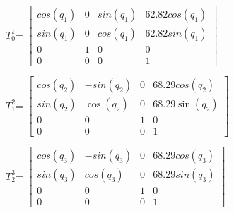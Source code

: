 \begin{center}

$T_0^1 $= 	\begin{math}
				\left[
				\begin{array}{cccc}
			   	cos(q_1)&               0&         sin(q_1)& 62.82cos(q_1)\\
         sin(q_1)&               0&         cos(q_1)& 62.82sin(q_1)\\
               0&               1&               0&            0 \\
               0&               0&               0&            1

				\end{array}
				\right]
				\end{math}\\
				
\vspace{1cm}

$T_1^2 $= 	\begin{math}
				\left[
				\begin{array}{cccc}
			   	cos(q_2)&	  		 -sin(q_2)&								0&			68.29cos(q_2)\\
          sin(q_2)&          \cos(q_2)&                0& 		 68.29\sin(q_2)\\
                0&                0&                1&                0\\
                0&                0&                0&                1
				\end{array}
				\right]
				\end{math}\\

\vspace{1cm}				

$T_2^3 $= 	\begin{math}
				\left[
				\begin{array}{cccc}
			   	cos(q_3)&	  		 -sin(q_3)&								0&			68.29cos(q_3)\\
          sin(q_3)&          cos(q_3)&                0& 		 68.29sin(q_3)\\
                0&                0&                1&                0\\
                0&                0&                0&                1

				\end{array}
				\right]
				\end{math}\\
				

\end{center}
